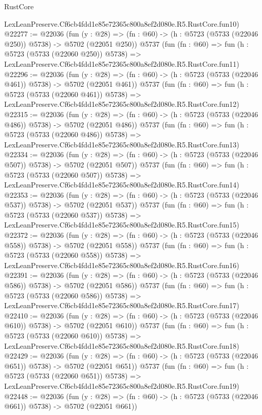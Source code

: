 \begin{lexlean}{RustCore}
\begin{coremodule}
    LexLeanPreserve.Cf6cb4fdd1e85e72365c800a8ef2d080e.R5.RustCore.fun10)
@22277 := @22036
    (fun (y : @28) => (fn : @60) -> (h : @5723 (@5733 (@22046 @250)) @5738) -> @5702 (@22051 @250))
    @5737
    (fun (fn : @60) =>
    fun (h : @5723 (@5733 (@22060 @250)) @5738) =>
    LexLeanPreserve.Cf6cb4fdd1e85e72365c800a8ef2d080e.R5.RustCore.fun11)
@22296 := @22036
    (fun (y : @28) => (fn : @60) -> (h : @5723 (@5733 (@22046 @461)) @5738) -> @5702 (@22051 @461))
    @5737
    (fun (fn : @60) =>
    fun (h : @5723 (@5733 (@22060 @461)) @5738) =>
    LexLeanPreserve.Cf6cb4fdd1e85e72365c800a8ef2d080e.R5.RustCore.fun12)
@22315 := @22036
    (fun (y : @28) => (fn : @60) -> (h : @5723 (@5733 (@22046 @486)) @5738) -> @5702 (@22051 @486))
    @5737
    (fun (fn : @60) =>
    fun (h : @5723 (@5733 (@22060 @486)) @5738) =>
    LexLeanPreserve.Cf6cb4fdd1e85e72365c800a8ef2d080e.R5.RustCore.fun13)
@22334 := @22036
    (fun (y : @28) => (fn : @60) -> (h : @5723 (@5733 (@22046 @507)) @5738) -> @5702 (@22051 @507))
    @5737
    (fun (fn : @60) =>
    fun (h : @5723 (@5733 (@22060 @507)) @5738) =>
    LexLeanPreserve.Cf6cb4fdd1e85e72365c800a8ef2d080e.R5.RustCore.fun14)
@22353 := @22036
    (fun (y : @28) => (fn : @60) -> (h : @5723 (@5733 (@22046 @537)) @5738) -> @5702 (@22051 @537))
    @5737
    (fun (fn : @60) =>
    fun (h : @5723 (@5733 (@22060 @537)) @5738) =>
    LexLeanPreserve.Cf6cb4fdd1e85e72365c800a8ef2d080e.R5.RustCore.fun15)
@22372 := @22036
    (fun (y : @28) => (fn : @60) -> (h : @5723 (@5733 (@22046 @558)) @5738) -> @5702 (@22051 @558))
    @5737
    (fun (fn : @60) =>
    fun (h : @5723 (@5733 (@22060 @558)) @5738) =>
    LexLeanPreserve.Cf6cb4fdd1e85e72365c800a8ef2d080e.R5.RustCore.fun16)
@22391 := @22036
    (fun (y : @28) => (fn : @60) -> (h : @5723 (@5733 (@22046 @586)) @5738) -> @5702 (@22051 @586))
    @5737
    (fun (fn : @60) =>
    fun (h : @5723 (@5733 (@22060 @586)) @5738) =>
    LexLeanPreserve.Cf6cb4fdd1e85e72365c800a8ef2d080e.R5.RustCore.fun17)
@22410 := @22036
    (fun (y : @28) => (fn : @60) -> (h : @5723 (@5733 (@22046 @610)) @5738) -> @5702 (@22051 @610))
    @5737
    (fun (fn : @60) =>
    fun (h : @5723 (@5733 (@22060 @610)) @5738) =>
    LexLeanPreserve.Cf6cb4fdd1e85e72365c800a8ef2d080e.R5.RustCore.fun18)
@22429 := @22036
    (fun (y : @28) => (fn : @60) -> (h : @5723 (@5733 (@22046 @651)) @5738) -> @5702 (@22051 @651))
    @5737
    (fun (fn : @60) =>
    fun (h : @5723 (@5733 (@22060 @651)) @5738) =>
    LexLeanPreserve.Cf6cb4fdd1e85e72365c800a8ef2d080e.R5.RustCore.fun19)
@22448 := @22036
    (fun (y : @28) => (fn : @60) -> (h : @5723 (@5733 (@22046 @661)) @5738) -> @5702 (@22051 @661))

\end{coremodule}
\end{lexlean}
